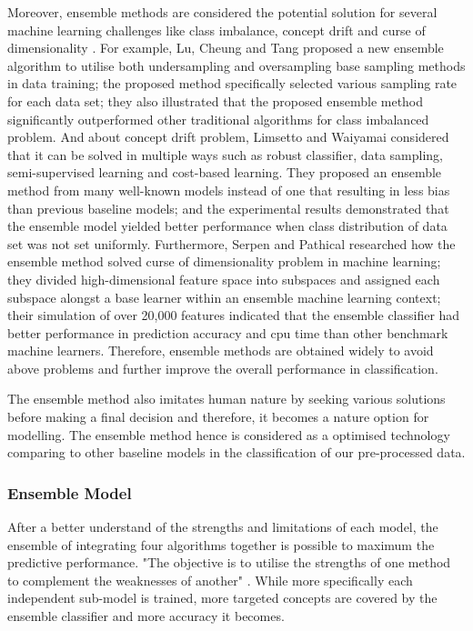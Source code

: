 \documentclass[10pt,journal,compsoc]{IEEEtran}
\begin{document}
Moreover, ensemble methods are considered the potential solution for several machine learning challenges like class imbalance, concept drift and curse of dimensionality \cite{Sagi}. For example, Lu, Cheung and Tang \cite{Lu} proposed a new ensemble algorithm to utilise both undersampling and oversampling base sampling methods in data training; the proposed method specifically selected various sampling rate for each data set; they also illustrated that the proposed ensemble method significantly outperformed other traditional algorithms for class imbalanced problem. And about concept drift problem, Limsetto and Waiyamai \cite{Limsetto} considered that it can be solved in multiple ways such as robust classifier, data sampling, semi-supervised learning and cost-based learning. They proposed an ensemble method from many well-known models instead of one that resulting in less bias than previous baseline models; and the experimental results demonstrated that the ensemble model yielded better performance when class distribution of data set was not set uniformly. Furthermore, Serpen and Pathical \cite{Serpen} researched how the ensemble method solved curse of dimensionality problem in machine learning; they divided high-dimensional feature space into subspaces and assigned each subspace alongst a base learner within an ensemble machine learning context; their simulation of over 20,000 features indicated that the ensemble classifier had better performance in prediction accuracy and cpu time than other benchmark machine learners. Therefore, ensemble methods are obtained widely to avoid above problems and further improve the overall performance in classification.

The ensemble method also imitates human nature by seeking various solutions before making a final decision \cite{Sagi} and therefore, it becomes a nature option for modelling. The ensemble method hence is considered as a optimised technology comparing to other baseline models in the classification of our pre-processed data.

\subsubsection{Ensemble Model}
After a better understand of the strengths and limitations of each model, the ensemble of integrating four algorithms together is possible to maximum the predictive performance. "The objective is to utilise the strengths of one method to complement the weaknesses of another" \cite{Kotsiantis}. While more specifically each independent sub-model is trained, more targeted concepts are covered by the ensemble classifier and more accuracy it becomes. 
\end{document}
